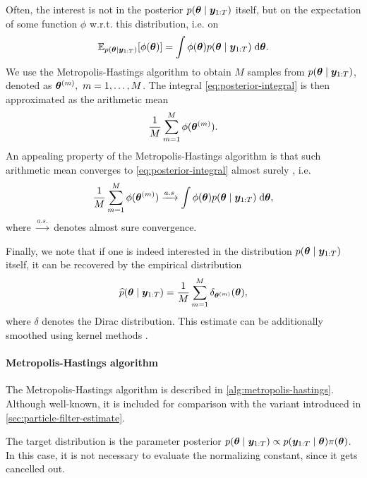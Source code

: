 Often, the interest is not in the posterior $p(\bm{\theta} \mid \bm{y}_{1:T})$ itself, but on the expectation of some function $\phi$ w.r.t. this distribution, i.e. on
\begin{equation} \label{eq:posterior-integral}
\mathbb{E}_{p(\bm{\theta} \mid \bm{y}_{1:T})}[\phi(\bm{\theta})] = \int \phi(\bm{\theta}) p(\bm{\theta} \mid \bm{y}_{1:T}) \; \mathrm{d}{\bm{\theta}}.
\end{equation}
We use the Metropolis-Hastings algorithm \citep{metropolis, hastings} to obtain $M$ samples from $p(\bm{\theta} \mid \bm{y}_{1:T})$, denoted as $\bm{\theta}^{(m)},\ m = 1, \ldots, M$. The integral \eqref{eq:posterior-integral} is then approximated as the arithmetic mean
\begin{equation*}
\frac{1}{M} \sum_{m=1}^M \phi(\bm{\theta}^{(m)}).
\end{equation*}
An appealing property of the Metropolis-Hastings algorithm is that such arithmetic mean converges to \eqref{eq:posterior-integral} almost surely \citep{robert-casella}, i.e.
\begin{equation*}
\frac{1}{M} \sum_{m=1}^M \phi(\bm{\theta}^{(m)}) \xrightarrow{a.s} \int \phi(\bm{\theta}) p(\bm{\theta} \mid \bm{y}_{1:T}) \; \mathrm{d}{\bm{\theta}},
\end{equation*}
where $\xrightarrow{a.s.}$ denotes almost sure convergence.

Finally, we note that if one is indeed interested in the distribution $p(\bm{\theta} \mid \bm{y}_{1:T})$ itself, it can be recovered by the empirical distribution
\begin{equation*}
\widehat{p}(\bm{\theta} \mid \bm{y}_{1:T}) = \frac{1}{M} \sum_{m=1}^M \delta_{\bm{\theta}^{(m)}}(\bm{\theta}),
\end{equation*}
where $\delta$ denotes the Dirac distribution. This estimate can be additionally smoothed using kernel methods \citep{kernel-smoothing}.


\paragraph{Metropolis-Hastings algorithm}
The Metropolis-Hastings algorithm is described in \autoref{alg:metropolis-hastings}. Although well-known, it is included for comparison with the variant introduced in \autoref{sec:particle-filter-estimate}.

The target distribution is the parameter posterior $p(\bm{\theta} \mid \bm{y}_{1:T}) \propto p(\bm{y}_{1:T} \mid \bm{\theta}) \pi(\bm{\theta})$. In this case, it is not necessary to evaluate the normalizing constant, since it gets cancelled out.

